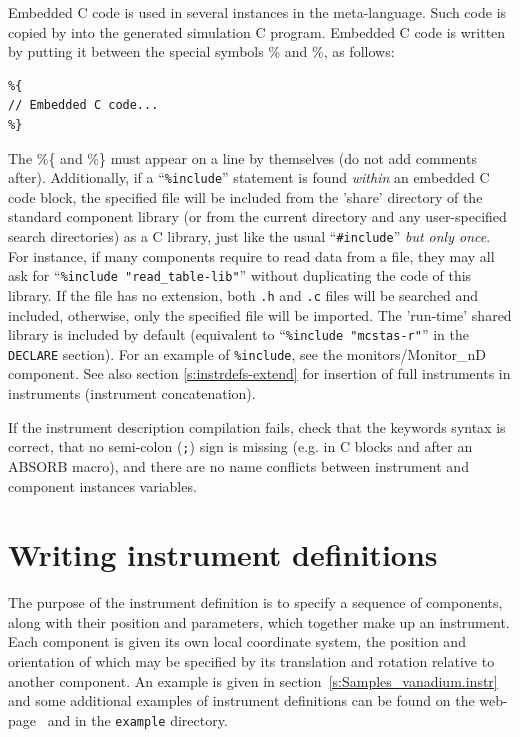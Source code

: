 Embedded C code is used in several instances in the \MCS
meta-language. Such code is copied by \mcs into the
generated simulation C program. Embedded C code is written by putting it
between the special symbols \%{ and \%}, as follows:
\begin{lstlisting}
%{ 
// Embedded C code...
%}
\end{lstlisting} 
The \%\{ and \%\} must appear on a line by themselves (do not add comments after).
Additionally, if a ``\verb+%include+'' statement is found \emph{within} an embedded C code block, the specified file will be included from the 'share' directory of the standard component library  (or from the
current directory and any user-specified search directories) as a C library, just like the usual ``\verb+#include+'' \emph{but only once}. For instance, if many components require to read data from a file, they may all ask for ``\verb+%include "read_table-lib"+''  without duplicating the code of this library. If the file has no extension, both \verb+.h+ and \verb+.c+ files will be searched and included, otherwise, only the specified file will be imported. The \MCS 'run-time' shared
library is included by default (equivalent to ``\verb+%include "mcstas-r"+'' in the \texttt{DECLARE} section). 
For an
example of \texttt{\%include}, see the monitors/Monitor\_nD component. See also section \ref{s:instrdefs-extend} for insertion of full instruments in instruments (instrument concatenation).

If the instrument description compilation fails, check that the
keywords syntax is correct, that no semi-colon (\verb+;+) sign is
missing (e.g. in C blocks and after an ABSORB macro),
and there are no name conflicts between instrument and component instances variables.


\section{Writing instrument definitions}
\label{s:instrdefs}

The purpose of the instrument definition is to specify a sequence of
components, along with their position and parameters, which together
make up an instrument. Each component is given its own local coordinate
system, the position and orientation of which may be specified by its
translation and rotation relative to another component. An example is
given in section~\ref{s:Samples_vanadium.instr} and some additional
examples of instrument definitions can be found on the \MCS
web-page~\cite{mcstas_webpage} and in the \texttt{example} directory.

